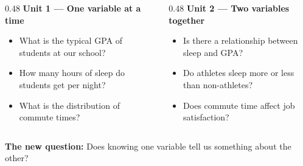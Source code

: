 \documentclass[aspectratio=169, 11pt]{beamer}
\begin{document}
{
\begin{frame}[t, plain]
  \hspace{0.4cm}%
  \begin{minipage}{0.93\textwidth}
    \vspace{0.3cm}
    \begin{columns}[T]

      \begin{column}{0.48\textwidth}
        \small
        \textbf{\color{navy}Unit 1 --- One variable at a time}
        \begin{itemize}
          \setlength{\itemsep}{0.35em}
          \item What is the typical GPA of students at our school?
          \item How many hours of sleep do students get per night?
          \item What is the distribution of commute times?
        \end{itemize}
      \end{column}

      \begin{column}{0.48\textwidth}
        \small
        \textbf{\color{navy}Unit 2 --- Two variables together}
        \begin{itemize}
          \setlength{\itemsep}{0.35em}
          \item Is there a relationship between sleep and GPA?
          \item Do athletes sleep more or less than non-athletes?
          \item Does commute time affect job satisfaction?
        \end{itemize}
      \end{column}

    \end{columns}
    \vspace{0.6cm}
    \small\textbf{The new question:}\enspace
    Does knowing one variable tell us something about the other?
  \end{minipage}
\end{frame}
}
\end{document}
